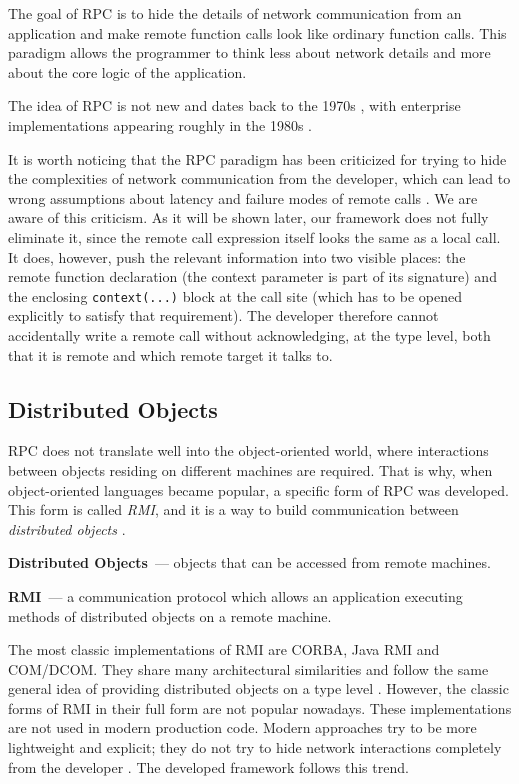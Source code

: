\documentclass[a4paper,11pt,oneside]{article}
\newcommand{\term}[1]{\textit{#1}}
\newcommand{\makedefinition}[3][]{\textbf{#2}\ifthenelse{\equal{#1}{}}{}{~(#1)}~--- #3.}
\newcommand{\kotlini}[1]{\texttt{#1}}
\begin{document}
The goal of RPC is to hide the details of network communication from an application and make remote
function calls look like ordinary function calls. This paradigm allows the programmer to think less about
network details and more about the core logic of the application.

The idea of RPC is not new and dates back to the 1970s \cite{white_high-level_1976}, with enterprise
implementations appearing roughly in the 1980s \cite{birrell_implementing_1984}.

It is worth noticing that the RPC paradigm has been criticized for trying to hide the
complexities of network communication from the developer, which can lead to wrong assumptions
about latency and failure modes of remote calls \cite{tanenbaum_critique_nodate}. We are aware of
this criticism. As it will be shown later, our framework does not fully eliminate it, since the
remote call expression itself looks the same as a local call. It does, however, push the relevant
information into two visible places: the remote function declaration (the context parameter is
part of its signature) and the enclosing \kotlini{context(...)} block at the call site (which has
to be opened explicitly to satisfy that requirement). The developer therefore cannot accidentally
write a remote call without acknowledging, at the type level, both that it is remote and which
remote target it talks to.

\subsection{Distributed Objects}

RPC does not translate well into the object-oriented world, where interactions between objects residing
on different machines are required. That is why, when object-oriented languages became popular, a
specific form of RPC was developed. This form is called \term{RMI}, and it is a way to build
communication between \term{distributed objects} \cite{wollrath_distributed_1996} \cite{tanenbaum_distributed_2006}.

\makedefinition{Distributed Objects}{objects that can be accessed from remote machines}

\makedefinition[remote method invocation]{RMI}{a communication protocol which allows an application
executing methods of distributed objects on a remote machine}

The most classic implementations of RMI are CORBA, Java RMI \cite{noauthor_java_nodate} and
COM/DCOM. They share many architectural similarities and follow the same general idea of providing
distributed objects on a type level \cite{plasil_architectural_1998}. However, the classic forms of RMI in
their full form are not popular nowadays. These implementations are not used in modern production
code. Modern approaches try to be more lightweight and explicit; they do not try to hide network
interactions completely from the developer \cite{ryan_grpc_2015}. The developed framework follows this
trend.
\end{document}
